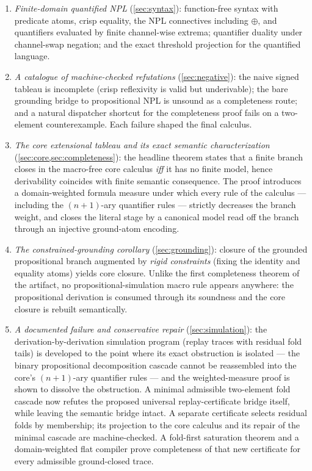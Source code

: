 \documentclass[11pt,a4paper]{article}
\theoremstyle{definition}
\newcommand{\hmz}{\oplus}
\begin{document}
\begin{enumerate}
\item \emph{Finite-domain quantified NPL} (\cref{sec:syntax}): function-free
  syntax with predicate atoms, crisp equality, the NPL connectives
  including $\hmz$, and quantifiers evaluated by finite channel-wise
  extrema; quantifier duality under channel-swap negation; and the exact
  threshold projection for the quantified language.
\item \emph{A catalogue of machine-checked refutations}
  (\cref{sec:negative}): the naive signed tableau is incomplete (crisp
  reflexivity is valid but underivable); the bare grounding bridge to
  propositional NPL is unsound as a completeness route; and a natural
  dispatcher shortcut for the completeness proof fails on a two-element
  counterexample. Each failure shaped the final calculus.
\item \emph{The core extensional tableau and its exact semantic
  characterization} (\cref{sec:core,sec:completeness}): the headline
  theorem states that a finite branch closes in the macro-free core
  calculus \emph{iff} it has no finite model, hence derivability coincides
  with finite semantic consequence. The proof introduces a domain-weighted
  formula measure under which every rule of the calculus — including the
  $(n{+}1)$-ary quantifier rules — strictly decreases the branch weight,
  and closes the literal stage by a canonical model read off the branch
  through an injective ground-atom encoding.
\item \emph{The constrained-grounding corollary} (\cref{sec:grounding}):
  closure of the grounded propositional branch augmented by \emph{rigid
  constraints} (fixing the identity and equality atoms) yields core
  closure. Unlike the first completeness theorem of the artifact, no
  propositional-simulation macro rule appears anywhere: the propositional
  derivation is consumed through its soundness and the core closure is
  rebuilt semantically.
\item \emph{A documented failure and conservative repair} (\cref{sec:simulation}): the
  derivation-by-derivation simulation program (replay traces with residual
  fold tails) is developed to the point where its exact obstruction is
  isolated — the binary propositional decomposition cascade cannot be
  reassembled into the core's $(n{+}1)$-ary quantifier rules — and the
  weighted-measure proof is shown to dissolve the obstruction. A minimal
  admissible two-element fold cascade now refutes the proposed universal
  replay-certificate bridge itself, while leaving the semantic bridge
  intact. A separate certificate selects residual folds by membership;
  its projection to the core calculus and its repair of the minimal
  cascade are machine-checked. A fold-first saturation theorem and a
  domain-weighted flat compiler prove completeness of that new certificate
  for every admissible ground-closed trace.
\end{enumerate}
\end{document}
